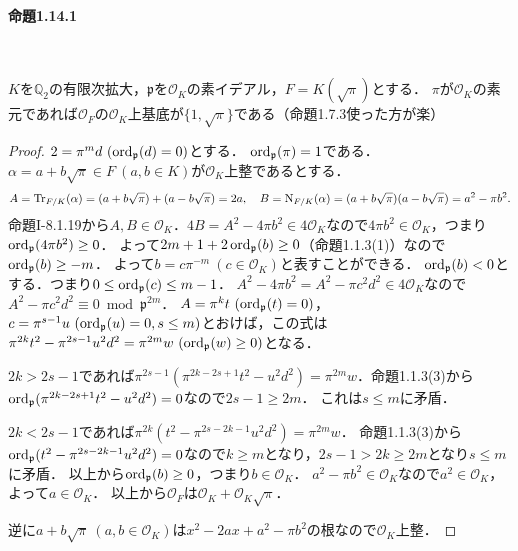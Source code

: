 \paragraph{命題1.14.1}~
\begin{screen}
  \begin{lem}\label{basis_Q2_prime_element}
    $K$を$\mathbb{Q}_2$の有限次拡大，$\mathfrak{p}$を$\mathcal{O}_K$の素イデアル，$F=K(\sqrt{\pi})$とする．
    $\pi$が$\mathcal{O}_K$の素元であれば$\mathcal{O}_F$の$\mathcal{O}_K$上基底が$\{1,\sqrt{\pi}\}$である（命題1.7.3使った方が楽）
  \end{lem}
\end{screen}
\begin{proof}
  $2=\pi^md\ (\ord_\mathfrak{p}(d)=0)$とする．
  $\operatorname{ord}_\mathfrak{p}(\pi)=1$である．
  $\alpha=a+b\sqrt{\pi}\in F\ (a,b\in K)$が$\mathcal{O}_K$上整であるとする．
  \[A=\operatorname{Tr}_{F/K}(\alpha)=(a+b\sqrt{\pi})+(a-b\sqrt{\pi})=2a,\quad B=\operatorname{N}_{F/K}(\alpha)=(a+b\sqrt{\pi})(a-b\sqrt{\pi})=a^2-\pi b^2.\]
  命題I-8.1.19から$A, B\in\mathcal{O}_K$．$4B=A^2-4\pi b^2\in 4\mathcal{O}_K$なので$4\pi b^2\in\mathcal{O}_K$，つまり$\operatorname{ord}_\mathfrak{p}(4\pi b^2)\geq 0$．
  よって$2m+1+2\operatorname{ord}_\mathfrak{p}(b)\geq 0$（命題1.1.3(1)）なので$\operatorname{ord}_\mathfrak{p}(b)\geq -m$．
  よって$b=c\pi^{-m}\ (c\in\mathcal{O}_K)$と表すことができる．
  $\operatorname{ord}_\mathfrak{p}(b)< 0$とする．つまり$0\leq\operatorname{ord}_\mathfrak{p}(c)\leq m-1$．
  $A^2-4\pi b^2=A^2-\pi c^2d^2\in 4\mathcal{O}_K$なので$A^2-\pi c^2d^2\equiv 0\bmod\mathfrak{p}^{2m}$．
  $A=\pi^kt\ (\ord_\mathfrak{p}(t)=0)$，$c=\pi^{s-1}u\ (\operatorname{ord}_\mathfrak{p}(u)=0, s\leq m)$とおけば，この式は$\pi^{2k}t^2-\pi^{2s-1}u^2d^2=\pi^{2m}w\ (\ord_\mathfrak{p}(w)\geq0)$となる．

  $2k>2s-1$であれば$\pi^{2s-1}(\pi^{2k-2s+1}t^2-u^2d^2)=\pi^{2m}w$．命題1.1.3(3)から$\operatorname{ord}_\mathfrak{p}(\pi^{2k-2s+1}t^2-u^2d^2)=0$なので$2s-1\geq 2m$．
  これは$s\leq m$に矛盾．

  $2k< 2s-1$であれば$\pi^{2k}(t^2-\pi^{2s-2k-1}u^2d^2)=\pi^{2m}w$．
  命題1.1.3(3)から$\operatorname{ord}_\mathfrak{p}(t^2-\pi^{2s-2k-1}u^2d^2)=0$なので$k\geq m$となり，$2s-1>2k\geq2m$となり$s\leq m$に矛盾．
  以上から$\operatorname{ord}_\mathfrak{p}(b)\geq 0$，つまり$b\in\mathcal{O}_K$．
  $a^2-\pi b^2\in\mathcal{O}_K$なので$a^2\in\mathcal{O}_K$，よって$a\in\mathcal{O}_K$．
  以上から$\mathcal{O}_F$は$\mathcal{O}_K+\mathcal{O}_K\sqrt{\pi}$．

  逆に$a+b\sqrt{\pi}\ (a,b\in\mathcal{O}_K)$は$x^2-2ax+a^2-\pi b^2$の根なので$\mathcal{O}_K$上整．
\end{proof}

